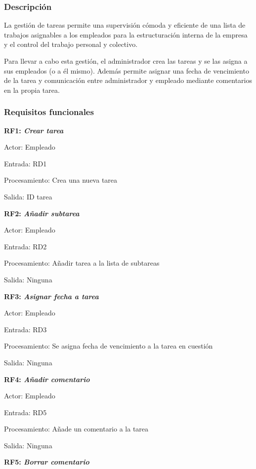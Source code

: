 \documentclass[paper=a4, fontsize=11pt, spanish]{scrartcl}
\begin{document}
\subsubsection{Descripción}
\setlength{\parindent}{3em} La gestión de tareas permite una supervisión cómoda y eficiente de una lista de trabajos asignables a los empleados para la estructuración interna de la empresa y el control del trabajo personal y colectivo.

	Para llevar a cabo esta gestión, el administrador crea las tareas y se las asigna a sus empleados (o a él mismo). Además permite asignar una fecha de vencimiento de la tarea y comunicación entre administrador y empleado mediante comentarios en la propia tarea.

\subsubsection{Requisitos funcionales}
\setlength{\parindent}{0em}
\textbf{RF1: \textit{Crear tarea}}
\setlength{\parindent}{2em}

Actor: Empleado

Entrada: RD1

Procesamiento: Crea una nueva tarea

Salida: ID tarea

\setlength{\parindent}{0em}
\textbf{RF2: \textit{Añadir subtarea}}
\setlength{\parindent}{2em}

Actor: Empleado

Entrada: RD2

Procesamiento: Añadir tarea a la lista de subtareas

Salida: Ninguna

\setlength{\parindent}{0em}
\textbf{RF3: \textit{Asignar fecha a tarea}}
\setlength{\parindent}{2em}

Actor: Empleado

Entrada: RD3

Procesamiento: Se asigna fecha de vencimiento a la tarea en cuestión

Salida: Ninguna

\setlength{\parindent}{0em}
\textbf{RF4: \textit{Añadir comentario}}
\setlength{\parindent}{2em}

Actor: Empleado

Entrada: RD5

Procesamiento: Añade un comentario a la tarea

Salida: Ninguna

\setlength{\parindent}{0em}
\textbf{RF5: \textit{Borrar comentario}}
\setlength{\parindent}{2em}
\end{document}

